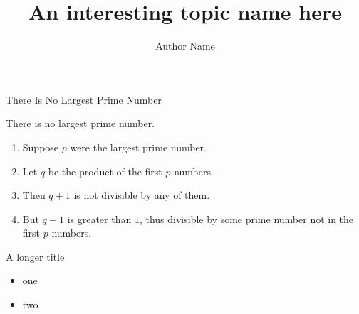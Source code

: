 \documentclass{beamer}
\title{An interesting topic name here}
\author{Author Name}
\institute{institute}
\begin{document}
	
	\begin{frame}
		\titlepage
	\end{frame}
	
	
	\begin{frame}{There Is No Largest Prime Number} 
		\begin{theorem}
			There is no largest prime number. \end{theorem} 
		\begin{enumerate} 
			\item<1-| alert@1> Suppose $p$ were the largest prime number. 
			\item<2-> Let $q$ be the product of the first $p$ numbers. 
			\item<3-> Then $q+1$ is not divisible by any of them. 
			\item<1-> But $q + 1$ is greater than $1$, thus divisible by some prime
			number not in the first $p$ numbers.
		\end{enumerate}
	\end{frame}
	
	\begin{frame}{A longer title}
		\begin{itemize}
			\item one
			\item two
		\end{itemize}
	\end{frame}
	
\end{document}
